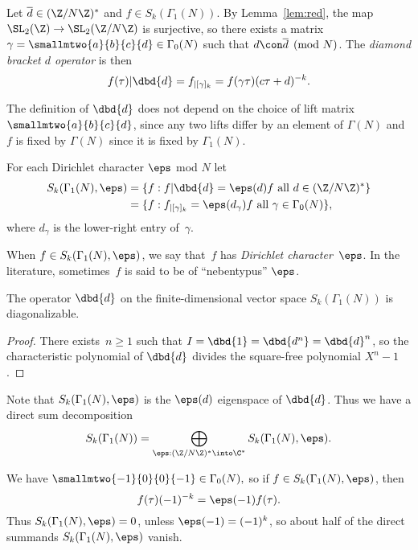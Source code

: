\documentclass{report}
\begin{document}
\begin{definition}
Let $\overline{d}\in(\Z/N\Z)^{*}$ and $f\in S_k(\Gamma_1(N))$.
By Lemma~\ref{lem:red}, the map $\SL_2(\Z)\to\SL_2(\Z/N\Z)$ is surjective,  so there exists a matrix
$\gamma=\smallmtwo{a}{b}{c}{d}
        \in\Gamma_0(N)$
such that $d\con\overline{d}\pmod{N}$. The {\em
diamond bracket $d$ operator} is then
\[
 f(\tau)|\dbd{d} = f_{|[\gamma]_k} =  f(\gamma\tau)(c\tau+d)^{-k}.
\]
\end{definition}


The definition of $\dbd{d}$ does not depend on the choice of lift matrix
$\smallmtwo{a}{b}{c}{d}$, since any two lifts differ by an element of
$\Gamma(N)$ and $f$ is fixed by $\Gamma(N)$ since it is fixed by $\Gamma_1(N)$.

For each Dirichlet character $\eps$ mod $N$ let
\begin{align*}
  S_k(\Gamma_1(N),\eps) &=
          \{ f : f|\dbd{d} =
         \eps(d) f
             \text{ all } d\in(\Z/N\Z)^* \}\\
&=
        \{ f : f_{|[\gamma]_k} = \eps(d_\gamma) f
             \text{ all } \gamma  \in \Gamma_0(N) \},
\end{align*}
where $d_\gamma$ is the lower-right entry of~$\gamma$.

When $f\in{}S_k(\Gamma_1(N),\eps)$, we say that~$f$
has {\em Dirichlet character}~$\eps$.  In the literature, sometimes~$f$ is said to
be of ``nebentypus'' $\eps$.

\begin{lemma}
 The operator $\dbd{d}$ on the finite-dimensional vector
space $S_k(\Gamma_1(N))$ is diagonalizable.
\end{lemma}
\begin{proof}
There exists~$n\geq 1$ such that $I=\dbd{1}=\dbd{d^n}=\dbd{d}^n$, so the
characteristic polynomial of $\dbd{d}$ divides the square-free
polynomial $X^n-1$.
\end{proof}
Note that $S_k(\Gamma_1(N),\eps)$ is the $\eps(d)$ eigenspace of $\dbd{d}$.
Thus we have a direct sum decomposition
\[
S_k(\Gamma_1(N))=\bigoplus_{\eps:(\Z/N\Z)^{*}\into\C^{*}}
                             S_k(\Gamma_1(N),\eps).
\]

We have
 $\smallmtwo{-1}{\hfill 0}{\hfill 0}{-1}\in\Gamma_0(N),$
so if $f\in{}S_k(\Gamma_1(N),\eps)$, then
$$f(\tau)(-1)^{-k}=\eps(-1)f(\tau).$$
Thus $S_k(\Gamma_1(N),\eps)=0$, unless $\eps(-1)=(-1)^{k}$,
so about half of the direct summands $S_k(\Gamma_1(N),\eps)$
vanish.
\end{document}

